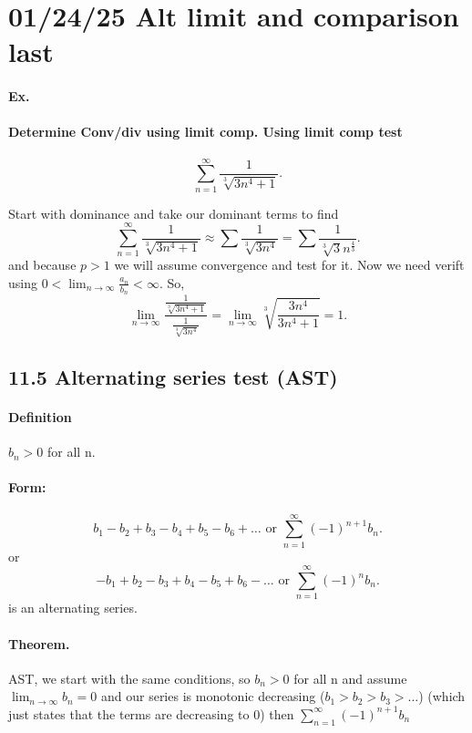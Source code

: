 \section{01/24/25 Alt limit and comparison last}%
\label{sec:01/24/25 Alt limit and comparison last}

\paragraph{Ex.}
\paragraph{Determine Conv/div using limit comp. Using limit comp test}
\[
\sum_{ n=1 } ^{ \infty } \frac{ 1 }{ \sqrt[ 3 ]{ 3n^{ 4 }+ 1}  } 
.\] 

Start with dominance and take our dominant terms to find
\[
\sum_{ n=1 } ^{ \infty } \frac{ 1 }{ \sqrt[ 3 ]{ 3n^{ 4 }+1 }  } \approx \sum_{  } ^{  } \frac{ 1 }{ \sqrt[ 3 ]{ 3n^{ 4 } }  } =\sum_{  } ^{  } \frac{ 1 }{ \sqrt[ 3 ]{ 3 } n^{ \frac{ 4 }{ 3 }  } } 
.\] 
and because $ p > 1 $ we will assume convergence and test for it. Now we need verift using $ 0<\lim_{ n \to \infty} \frac{ a_n }{ b_n } <\infty $. So, 
\[
\lim_{ n \to \infty} \frac{ \frac{ 1 }{ \sqrt[ 3 ]{ 3n^{ 4 }+1 }  }  } {\frac{ 1 }{ \sqrt[ 3 ]{ 3n^{ 4 } }  }}  = \lim_{ n \to \infty} \sqrt[ 3 ]{ \frac{ 3n^{ 4 } }{ 3n^{ 4 }+1 } }= 1
.\] 

\subsection*{11.5 Alternating series test (AST)}%
\label{sub:11.5 Alternating series test (AST)}

\paragraph{Definition\\}
$ b_n > 0 $ for all n.
\paragraph{Form:}
\[
b_1 - b_2 + b_3 - b_4 + b_5 - b_6 + \ldots \text{ or }\sum_{ n=1 } ^{ \infty } \left( -1 \right) ^{ n+1 }b_n
.\] 
or
\[
-b_1 + b_2 - b_3 + b_4 - b_5 + b_6 - \ldots \text{ or }\sum_{ n=1 } ^{ \infty } \left( -1 \right) ^{ n }b_n
.\] 
is an alternating series.

\paragraph{Theorem.} AST, we start with the same conditions, so $ b_n > 0 $ for all n and assume $ \lim_{ n \to \infty} b_n=0 $ and our series is monotonic decreasing ($ b_1 > b_2 > b_3 > \ldots $) (which just states  that the terms are decreasing to 0) then $ \sum_{ n=1 } ^{ \infty } \left( -1 \right)^{ n+1 }b_n  $

